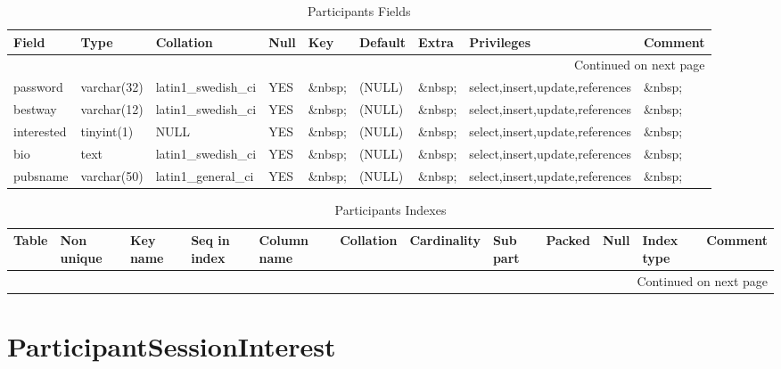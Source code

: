 \documentclass[tablesignature,landscape]{scrartcl}
\begin{document}
\begin{longtable}{|l|l|l|l|l|l|l|l|l|}
\caption{Participants Fields} \label{tbl:participantsfields}\\
\hline
 Field       &  Type         &  Collation                &  Null     &  Key      &  Default  &  Extra    &  Privileges                       &  Comment \\
\hline
\endhead
\hline\multicolumn{9}{r}{Continued on next page}\
\endfoot
\endlastfoot
\hline
 badgeid     &  varchar(15)  &  latin1\_{}swedish\_{}ci  &  \&nbsp;  &  PRI      &  \&nbsp;  &  \&nbsp;  &  select,insert,update,references  &  \&nbsp;  \\
 password    &  varchar(32)  &  latin1\_{}swedish\_{}ci  &  YES      &  \&nbsp;  &  (NULL)   &  \&nbsp;  &  select,insert,update,references  &  \&nbsp;  \\
 bestway     &  varchar(12)  &  latin1\_{}swedish\_{}ci  &  YES      &  \&nbsp;  &  (NULL)   &  \&nbsp;  &  select,insert,update,references  &  \&nbsp;  \\
 interested  &  tinyint(1)   &  NULL                     &  YES      &  \&nbsp;  &  (NULL)   &  \&nbsp;  &  select,insert,update,references  &  \&nbsp;  \\
 bio         &  text         &  latin1\_{}swedish\_{}ci  &  YES      &  \&nbsp;  &  (NULL)   &  \&nbsp;  &  select,insert,update,references  &  \&nbsp;  \\
 pubsname    &  varchar(50)  &  latin1\_{}general\_{}ci  &  YES      &  \&nbsp;  &  (NULL)   &  \&nbsp;  &  select,insert,update,references  &  \&nbsp;  \\
\hline
\end{longtable}


\begin{longtable}{|l|l|l|l|l|l|l|l|l|l|l|l|}
\caption{Participants Indexes} \label{tbl:participantsindexes}\\
\hline
 Table         &  Non unique  &  Key name  &  Seq in index  &  Column name  &  Collation  &  Cardinality  &  Sub part  &  Packed  &  Null     &  Index type  &  Comment \\
\hline
\endhead
\hline\multicolumn{12}{r}{Continued on next page}\
\endfoot
\endlastfoot
\hline
 Participants  &           0  &  PRIMARY   &             1  &  badgeid      &  A          &            2  &  (NULL)    &  (NULL)  &  \&nbsp;  &  BTREE       &  \&nbsp;  \\
\hline
\end{longtable}
\section{ParticipantSessionInterest}
\label{sec-11}
\end{document}
